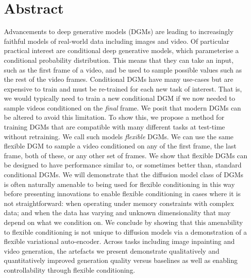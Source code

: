 
\chapter{Abstract}

Advancements to deep generative models (DGMs) are leading to increasingly faithful models of real-world data including images and video. Of particular practical interest are conditional deep generative models, which parameterise a conditional probability distribution. This means that they can take an input, such as the first frame of a video, and be used to sample possible values such as the rest of the video frames. Conditional DGMs have many use-cases but are expensive to train and must be re-trained for each new task of interest. That is, we would typically need to train a new conditional DGM if we now needed to sample videos conditioned on the \textit{final} frame. We posit that modern DGMs can be altered to avoid this limitation. To show this, we propose a method for training DGMs that are compatible with many different tasks at test-time without retraining. We call such models \textit{flexible} DGMs. We can use the same flexible DGM to sample a video conditioned on any of the first frame, the last frame, both of these, or any other set of frames. We show that flexible DGMs can be designed to have performance similar to, or sometimes better than, standard conditional DGMs. We will demonstrate that the diffusion model class of DGMs is often naturally amenable to being used for flexible conditioning in this way before presenting innovations to enable flexible conditioning in cases where it is not straightforward: when operating under memory constraints with complex data; and when the data has varying and unknown dimensionality that may depend on what we condition on. We conclude by showing that this amenability to flexible conditioning is not unique to diffusion models via a demonstration of a flexible variational auto-encoder. Across tasks including image inpainting and video generation, the artefacts we present demonstrate qualitatively and quantitatively improved generation quality versus baselines as well as enabling controllability through flexible conditioning.
